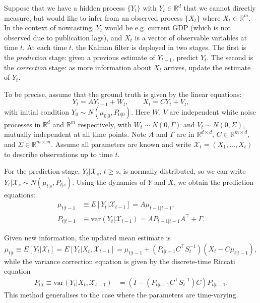 \documentclass[a4paper, 12pt]{article}
\theoremstyle{remark}
\begin{document}
Suppose that we have a hidden process $\{ Y_t \}$ with $Y_t \in \mathbb{R}^d$ that we cannot directly measure, but would like to infer from an observed process $\{ X_t \}$ where $X_t \in \mathbb{R}^m$.
In the context of nowcasting, $Y_t$ would be e.g. current GDP (which is not observed due to publication lags), and $X_t$ is a vector of observable variables at time $t$.
At each time $t$, the Kalman filter is deployed in two stages. The first is the \textit{prediction} stage: given a previous estimate of $Y_{t-1}$, predict $Y_t$. The second is the \textit{correction} stage: as more information about $X_t$ arrives, update the estimate of $Y_t$.

To be precise, assume that the ground truth is given by the linear equations:
$$Y_t = AY_{t-1} +  W_t,\qquad X_t = CY_t + V_t,$$
with initial condition $Y_0 \sim N(\mu_{0|0}, P_{0|0})$.
Here $W$, $V$ are independent white noise processes in $\mathbb{R}^{d}$ and $\mathbb{R}^m$ respectively, with $W_t\sim N(0, \Gamma)$ and $V_t \sim N(0, \Sigma)$, mutually independent at all time points. Note $A$ and $\Gamma$ are in $\mathbb{R}^{d\times d}$, $C\in \mathbb{R}^{m\times d}$, and $\Sigma\in \mathbb{R}^{m\times m}$. Assume all parameters are known and write \(\mathcal{X}_t = (X_1, \dots, X_t)\) to describe observations up to time \(t\).

For the prediction stage, $Y_t|\mathcal{X}_s$, $t \ge s$, is normally distributed, so we can write $Y_t|\mathcal{X}_s \sim N(\mu_{t|s}, P_{t|s})$.
Using the dynamics of $Y$ and $X$, we obtain the prediction equations:
\begin{equation*}
    \begin{split}
    \mu_{t|t-1} &\equiv  E[Y_t|\mathcal{X}_{t-1}] =A \mu_{t-1|t-1},\\
    P_{t|t-1} & \equiv \mathrm{var}(Y_t|\mathcal{X}_{t-1}) = A P_{t-1|t-1} A^\top +  \Gamma.
    \end{split}
\end{equation*}

Given new information, 
the updated mean estimate is
\begin{equation}
\label{eq:DiscreteKalmanMean}
\mu_{t|t} \equiv E[Y_t|\mathcal{X}_{t}] = E[Y_t|X_t,\mathcal{X}_{t-1}]= \mu_{t|t-1} + (P_{t|t-1} C^\top S_{t}^{-1}) (X_t - C \mu_{t|t-1}),
\end{equation}
while the variance correction equation is given by the discrete-time Riccati equation
\begin{align}
\label{eq:DiscreteKalmanVariance}
P_{t|t} \equiv \mathrm{var}(Y_t|X_t, \mathcal{X}_{t-1})&= (I- (P_{t|t-1} C^\top S_{t}^{-1}) C)  P_{t|t-1}. 
\end{align}
This method generalises to the case where the parameters are time-varying.
\end{document}

